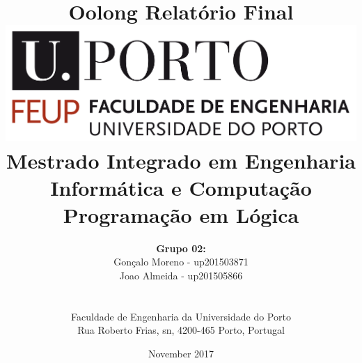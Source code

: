 \documentclass[a4paper]{article}
\begin{document}
\setlength{\textwidth}{16cm}
\setlength{\textheight}{22cm}

\title{\Huge\textbf{Oolong}\linebreak\linebreak\linebreak
\Large\textbf{Relatório Final}\linebreak\linebreak
\linebreak\linebreak
\includegraphics[scale=0.1]{feup-logo.png}\linebreak\linebreak
\linebreak\linebreak
\Large{Mestrado Integrado em Engenharia Informática e Computação} \linebreak\linebreak
\Large{Programação em Lógica}\linebreak
}

\author{\textbf{Grupo 02:}\\ Gonçalo Moreno - up201503871 \\ Joao Almeida - up201505866 \\\linebreak\linebreak \\
 \\ Faculdade de Engenharia da Universidade do Porto \\ Rua Roberto Frias, s\/n, 4200-465 Porto, Portugal \linebreak\linebreak\linebreak
\linebreak\linebreak\vspace{1cm}}
\date{November 2017}
\maketitle
\thispagestyle{empty}

\end{document}
